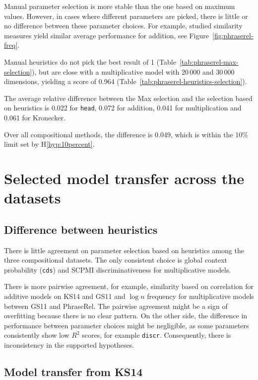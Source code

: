 Manual parameter selection is more stable than the one based on maximum values. However, in cases where different parameters are picked, there is little or no difference between these parameter choices. For example, studied similarity measures yield similar average performance for addition, see Figure~\ref{fig:phraserel-freq}.

Manual heuristics do not pick the best result of 1 (Table~\ref{tab:phraserel-max-selection}), but are close with a multiplicative model with 20\,000 and 30\,000 dimensions, yielding a score of 0.964 (Table~\ref{tab:phraserel-heuristics-selection}).

The average relative difference between the Max selection and the selection based on heuristics is 0.022 for \texttt{head}, 0.072 for addition, 0.041 for multiplication and 0.061 for Kronecker.

Over all compositional methods, the difference is 0.049, which is within the 10\% limit set by H\ref{hyp:10percent}.

\section{Selected model transfer across the datasets}
\label{sec:select-model-transf-comp}



\subsection{Difference between heuristics}
\label{sec:diff-betw-heur-comp}

There is little agreement on parameter selection based on heuristics among the three compositional datasets. The only consistent choice is global context probability (\texttt{cds}) and SCPMI discriminativeness for multiplicative models.

There is more pairwise agreement, for example, similarity based on correlation for additive models on KS14 and GS11 and $\log n$ frequency for multiplicative models between GS11 and PhraseRel. The pairwise agreement might be a sign of overfitting because there is no clear pattern. On the other side, the difference in performance between parameter choices might be negligible, as some parameters consistently show low $R^2$ scores, for example \texttt{discr}. Consequently, there is inconsistency in the supported hypotheses.

\subsection{Model transfer from KS14}
\label{sec:from-ks14}

